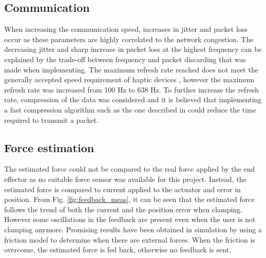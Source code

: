 
\subsection*{Communication}

When increasing the communication speed, increases in jitter and packet loss occur as these parameters are highly correlated to the network congestion. %
The decreasing jitter and sharp increase in packet loss at the highest frequency can be explained by the trade-off between frequency and packet discarding that was made when implementing.
The maximum refresh rate reached does not meet the generally accepted speed requirement of haptic devices \cite{coles2011role}, however the maximum refresh rate was increased from 100 Hz to 638 Hz.
To further increase the refresh rate, compression of the data was considered and it is believed that implementing a fast compression algorithm such as the one described in \cite{fast_ZIV} could reduce the time required to transmit a packet.
\vspace{-1em}
\subsection*{Force estimation}

The estimated force could not be compared to the real force applied by the end effector as no suitable force sensor was available for this project. Instead, the estimated force is compared to current applied to the actuator and error in position. From Fig. \ref{fig:feedback_meas}, it can be seen that the estimated force follows the trend of both the current and the position error when clamping. However some oscillations in the feedback are present even when the user is not clamping anymore. Promising results have been obtained in simulation by using a friction model to determine when there are external forces. When the friction is overcome, the estimated force is fed back, otherwise no feedback is sent.